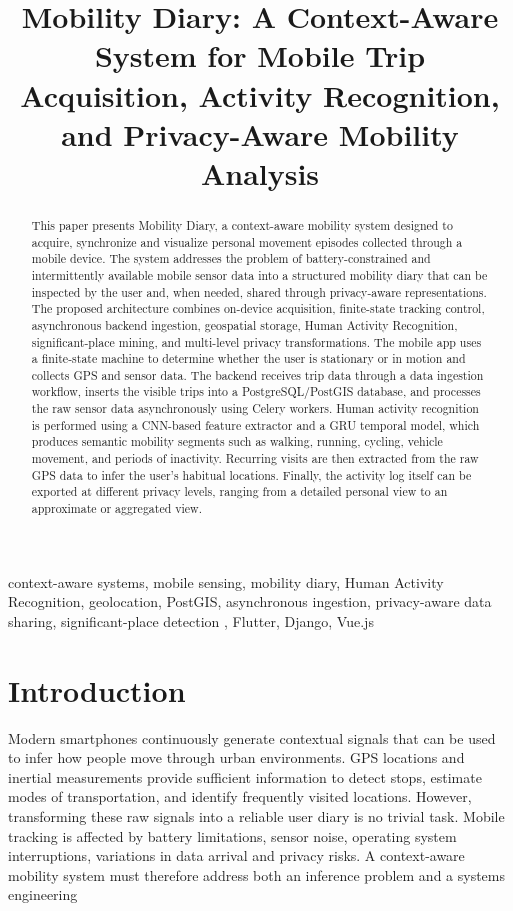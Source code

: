 \documentclass[conference,a4paper]{IEEEtran}
\begin{document}
\title{Mobility Diary: A Context-Aware System for Mobile Trip Acquisition, Activity Recognition, and Privacy-Aware Mobility Analysis}  \author{   }  \maketitle  \begin{abstract} This paper presents Mobility Diary, a context-aware mobility system designed to acquire, synchronize and visualize personal movement episodes collected through a mobile device. The system addresses the problem of battery-constrained and intermittently available mobile sensor data into a structured mobility diary that can be inspected by the user and, when needed, shared through privacy-aware representations. The proposed architecture combines on-device acquisition, finite-state tracking control, asynchronous backend ingestion, geospatial storage, Human Activity Recognition, significant-place mining, and multi-level privacy transformations.  The mobile app uses a finite-state machine to determine whether the user is stationary or in motion and collects GPS and sensor data. The backend receives trip data through a data ingestion workflow, inserts the visible trips into a PostgreSQL/PostGIS database, and processes the raw sensor data asynchronously using Celery workers. Human activity recognition is performed using a CNN-based feature extractor and a GRU temporal model, which produces semantic mobility segments such as walking, running, cycling, vehicle movement, and periods of inactivity. Recurring visits are then extracted from the raw GPS data to infer the user’s habitual locations. Finally, the activity log itself can be exported at different privacy levels, ranging from a detailed personal view to an approximate or aggregated view. \end{abstract}  \begin{IEEEkeywords} context-aware systems, mobile sensing, mobility diary, Human Activity Recognition, geolocation, PostGIS, asynchronous ingestion, privacy-aware data sharing, significant-place detection , Flutter, Django, Vue.js \end{IEEEkeywords}  \section{Introduction}  Modern smartphones continuously generate contextual signals that can be used to infer how people move through urban environments. GPS locations and inertial measurements provide sufficient information to detect stops, estimate modes of transportation, and identify frequently visited locations. However, transforming these raw signals into a reliable user diary is no trivial task. Mobile tracking is affected by battery limitations, sensor noise, operating system interruptions, variations in data arrival and privacy risks. A context-aware mobility system must therefore address both an inference problem and a systems engineering 
\end{document}
